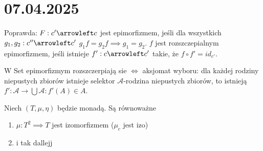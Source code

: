 \section{07.04.2025}{}

Poprawda:
$F:c'\arrowleft c$ jest epimorfizmem, jeśli dla wszystkich $g_1, g_2:c''\arrowleft c'$ $g_1f=g_2f\implies g_1=g_2$. $f$ jest rozszczepialnym epimorfizmem, jeśli istnieje $f':c\arrowleft c'$ takie, że $f\circ f'=id_{c'}$. 

W Set epimorfizmym rozszczerpiają sie $\iff$ aksjomat wyboru: dla każdej rodziny niepustych zbiorów istnieje selektor $\mathcal{A}$-rodzina niepustych zbiorów, to istnieją $f':\mathcal{A}\to \bigcup \mathcal{A}:f'(A)\in A$.

\begin{theorem}{}{}
  Niech $(T, \mu, \eta)$ będzie monadą. Są równoważne 
  \begin{enumerate}
    \item $\mu:T^2\implies T$ jest izomorfizmem ($\mu_c$ jest izo)
    \item i tak dallejj
  \end{enumerate}
\end{theorem}



